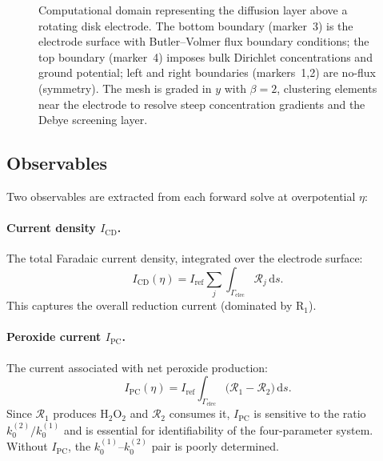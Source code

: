 \documentclass[11pt,a4paper]{article}
\newcommand{\dd}{\mathrm{d}}
\newcommand{\kzero}{k_0}
\begin{document}
\begin{figure}[H]
\caption{Computational domain representing the diffusion layer above a
  rotating disk electrode. The bottom boundary (marker~3) is the electrode
  surface with Butler--Volmer flux boundary conditions; the top boundary
  (marker~4) imposes bulk Dirichlet concentrations and ground potential;
  left and right boundaries (markers~1,2) are no-flux (symmetry).
  The mesh is graded in $y$ with $\beta=2$, clustering elements near
  the electrode to resolve steep concentration gradients and the Debye
  screening layer.}
\label{fig:domain}
\end{figure}

\subsection{Observables}\label{sec:observables}

Two observables are extracted from each forward solve at overpotential
$\eta$:

\paragraph{Current density $I_{\mathrm{CD}}$.}
The total Faradaic current density, integrated over the electrode surface:
\begin{equation}\label{eq:ICD}
  I_{\mathrm{CD}}(\eta) = I_{\mathrm{ref}} \sum_j
  \int_{\Gamma_{\mathrm{elec}}} \mathcal{R}_j \, \dd s.
\end{equation}
This captures the overall reduction current (dominated by R$_1$).

\paragraph{Peroxide current $I_{\mathrm{PC}}$.}
The current associated with net peroxide production:
\begin{equation}\label{eq:IPC}
  I_{\mathrm{PC}}(\eta) = I_{\mathrm{ref}}
  \int_{\Gamma_{\mathrm{elec}}}
  \bigl(\mathcal{R}_1 - \mathcal{R}_2\bigr) \,\dd s.
\end{equation}
Since $\mathcal{R}_1$ produces $\mathrm{H_2O_2}$ and $\mathcal{R}_2$
consumes it, $I_{\mathrm{PC}}$ is sensitive to the ratio
$\kzero^{(2)}/\kzero^{(1)}$ and is essential for identifiability of the
four-parameter system. Without $I_{\mathrm{PC}}$, the $\kzero^{(1)}$--$\kzero^{(2)}$
pair is poorly determined.
\end{document}
